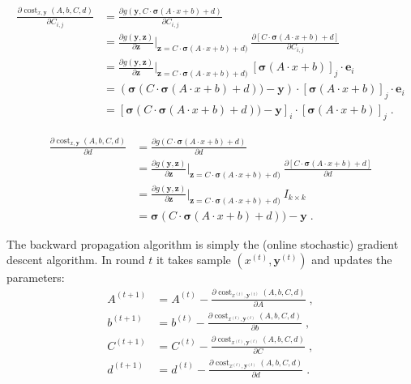 \documentclass[12pt]{article}
\DeclareMathOperator{\cost}{cost}
\newcommand{\bsigma}{\pmb{\sigma}}
\newcommand{\y}{\mathbf{y}}
\newcommand{\z}{\mathbf{z}}
\newcommand{\e}{\mathbf{e}}
\begin{document}
\begin{align*}
\frac{\partial \cost_{x,\y}(A,b,C,d)}{\partial C_{i,j}}
& = \frac{\partial g(\y, C \cdot \bsigma(A \cdot x + b) + d)}{\partial C_{i,j}} \\
& = \frac{\partial g(\y, \z)}{\partial \z}\bigg|_{\z=C \cdot \bsigma(A \cdot x + b) + d)} \ \frac{\partial [C \cdot \bsigma(A \cdot x + b) + d]}{\partial C_{i,j}} \\
& = \frac{\partial g(\y, \z)}{\partial \z}\bigg|_{\z=C \cdot \bsigma(A \cdot x + b) + d)} \ [\bsigma(A \cdot x + b)]_j \cdot \e_i \\
& = \left(\bsigma(C \cdot \bsigma(A \cdot x + b) + d))  - \y \right) \cdot [\bsigma(A \cdot x + b)]_j \cdot \e_i \\
& = \left[\bsigma(C \cdot \bsigma(A \cdot x + b) + d))  - \y \right]_i \cdot [\bsigma(A \cdot x + b)]_j \; .
\end{align*}

\begin{align*}
\frac{\partial \cost_{x,\y}(A,b,C,d)}{\partial d}
& = \frac{\partial g(C \cdot \bsigma(A \cdot x + b) + d)}{\partial d} \\
& = \frac{\partial g(\y, \z)}{\partial \z}\bigg|_{\z=C \cdot \bsigma(A \cdot x + b) + d)} \ \frac{\partial [C \cdot \bsigma(A \cdot x + b) + d]}{\partial d} \\
& = \frac{\partial g(\y, \z)}{\partial \z}\bigg|_{\z=C \cdot \bsigma(A \cdot x + b) + d)} \ I_{k \times k} \\
& = \bsigma(C \cdot \bsigma(A \cdot x + b) + d)) - \y \; .
\end{align*}

The backward propagation algorithm is simply the (online stochastic) gradient descent algorithm.
In round $t$ it takes sample $(x^{(t)}, \y^{(t)})$ and updates the parameters:
\begin{align*}
A^{(t+1)} & = A^{(t)} - \frac{\partial \cost_{x^{(t)},\y^{(t)}}(A,b,C,d)}{\partial A} \; , \\
b^{(t+1)} & = b^{(t)} - \frac{\partial \cost_{x^{(t)},\y^{(t)}}(A,b,C,d)}{\partial b} \; , \\
C^{(t+1)} & = C^{(t)} - \frac{\partial \cost_{x^{(t)},\y^{(t)}}(A,b,C,d)}{\partial C} \; , \\
d^{(t+1)} & = d^{(t)} - \frac{\partial \cost_{x^{(t)},\y^{(t)}}(A,b,C,d)}{\partial d} \; .
\end{align*}
\end{document}
